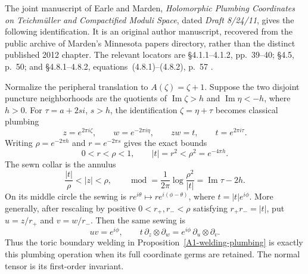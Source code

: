 \begin{proposition}\label{A1-Earle-Marden-original}
The joint manuscript of Earle and Marden,
\emph{Holomorphic Plumbing Coordinates on Teichm\"uller and Compactified
Moduli Space}, dated \emph{Draft 8/24/11}, gives the following identification.
It is an original author manuscript, recovered from the public archive of
Marden's Minnesota papers directory, rather than the distinct published
2012 chapter. The relevant locators are \S4.1.1--4.1.2, pp.~39--40;
\S4.5, p.~50; and \S4.8.1--4.8.2, equations~(4.8.1)--(4.8.2),
p.~57 \cite{EarleMarden2011DraftA567}.

Normalize the peripheral translation to $A(\zeta)=\zeta+1$.
Suppose the two disjoint puncture neighborhoods are the quotients of
$\operatorname{Im}\zeta>h$ and $\operatorname{Im}\eta<-h$, where $h>0$.
For $\tau=a+2si$, $s>h$, the identification
$\zeta=\eta+\tau$ becomes classical plumbing
\[
 z=e^{2\pi i\zeta},\qquad w=e^{-2\pi i\eta},\qquad
 zw=t,\qquad t=e^{2\pi i\tau}.
\]
Writing $\rho=e^{-2\pi h}$ and $r=e^{-2\pi s}$ gives the exact bounds
\[
 0<r<\rho<1,\qquad |t|=r^2<\rho^2=e^{-4\pi h}.
\]
The sewn collar is the annulus
\[
 \frac{|t|}{\rho}<|z|<\rho,\qquad
 \operatorname{mod}=\frac{1}{2\pi}\log\frac{\rho^2}{|t|}
                   =\operatorname{Im}\tau-2h.
\]
On its middle circle the sewing is
$re^{i\theta}\mapsto re^{i(\phi-\theta)}$, where
$t=|t|e^{i\phi}$. More generally, after rescaling by positive
$0<r_+,r_-<\rho$ satisfying $r_+r_-=|t|$, put $u=z/r_+$ and $v=w/r_-$.
Then the same sewing is
\[
 uv=e^{i\phi},\qquad
 t\,\partial_z\otimes\partial_w
   =e^{i\phi}\,\partial_u\otimes\partial_v.
\]
Thus the toric boundary welding in Proposition~\ref{A1-welding-plumbing}
is exactly this plumbing operation when its full coordinate germs are
retained. The normal tensor is its first-order invariant.
\end{proposition}
